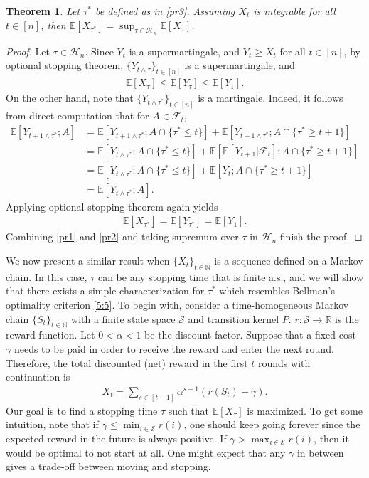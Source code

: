 \documentclass[letterpaper,11pt,openright,openany]{book}
\numberwithin{equation}{section}
\theoremstyle{plain}
\newtheorem{Th}{Theorem}[section]
\theoremstyle{definition}
\def\R{{\mathbb R}}
\def\N{{\mathbb N}}
\def\E{{\mathbb E}}
\def\F{{\mathcal F}}
\def\R{{\mathbb R}}
\def\H{{\mathcal H}}
\def\S{{\mathcal S}}
\begin{document}
\begin{Th}\label{OS}
Let $\tau^*$ be defined as in \eqref{pr3}. 
Assuming $X_t$ is integrable for all $t\in [n]$, then $\E[X_{\tau^*}] = \sup_{\tau\in\H_n}\E[X_\tau]$. 
\end{Th} 
\begin{proof}
Let $\tau\in\H_n$. Since $Y_t$ is a supermartingale, and $Y_t\geq X_t$ for all $t\in [n]$, by optional stopping theorem, $\{Y_{t\wedge\tau}\}_{t\in [n]}$ is a supermartingale, and 
\begin{align}
\E[X_\tau] \leq \E[Y_\tau]\leq \E[Y_1].\label{pr1}
\end{align}
On the other hand, note that $\{Y_{t\wedge\tau^*}\}_{t\in [n]}$ is a martingale. Indeed, it follows from direct computation that for $A\in\F_t$,
\begin{align*}
\E\left[Y_{t+1\wedge\tau^*}; A\right] &= \E\left[Y_{t+1\wedge\tau^*}; A\cap\{\tau^*\leq t\}\right] + \E\left[Y_{t+1\wedge\tau^*}; A\cap\{\tau^*\geq t+1\}\right]\\
& = \E\left[Y_{t\wedge\tau^*}; A\cap\{\tau^*\leq t\}\right] + \E\left[\E[Y_{t+1}|\F_t]; A\cap\{\tau^*\geq t+1\}\right]\\
& = \E\left[Y_{t\wedge\tau^*}; A\cap\{\tau^*\leq t\}\right] + \E\left[Y_{t}; A\cap\{\tau^*\geq t+1\}\right]\\
& = \E\left[Y_{t\wedge\tau^*}; A\right]. 
\end{align*} 
Applying optional stopping theorem again yields
\begin{align}
\E[X_{\tau^*}] = \E[Y_{\tau^*}] = \E[Y_1]. \label{pr2}
\end{align}
Combining \eqref{pr1} and \eqref{pr2} and taking supremum over $\tau$ in $\H_n$ finish the proof. 
\end{proof}

We now present a similar result when $\{X_t\}_{t\in\N}$ is a sequence defined on a Markov chain. 
In this case, $\tau$ can be any stopping time that is finite a.s., and we will show that there exists a simple characterization for $\tau^*$ which resembles Bellman's optimality criterion \eqref{5:5}. 
To begin with, consider a time-homogeneous Markov chain $\{S_t\}_{t\in\N}$ with a finite state space $\S$ and transition kernel $P$. 
$r:\S\to\R$ is the reward function. 
Let $0<\alpha<1$ be the discount factor. 
Suppose that a fixed cost $\gamma$ needs to be paid in order to receive the reward and enter the next round.
Therefore, the total discounted (net) reward in the first $t$ rounds with continuation is
\begin{align*}
X_t = \sum_{s\in [t-1]}\alpha^{s-1}(r(S_t)-\gamma).
\end{align*} 
Our goal is to find a stopping time $\tau$ such that $\E[X_\tau]$ is maximized. 
To get some intuition, note that if $\gamma\leq\min_{i\in\S}r(i)$, one should keep going forever since the expected reward in the future is always positive. If $\gamma>\max_{i\in\S}r(i)$, then it would be optimal to not start at all. One might expect that any $\gamma$ in between gives a trade-off between moving and stopping. 
\end{document}
